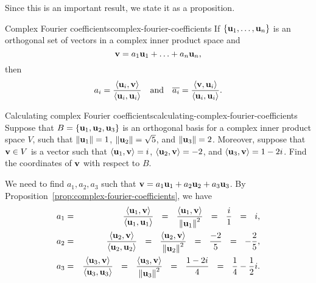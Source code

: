Since this is an important result, we state it as a proposition.

\begin{proposition}{Complex Fourier coefficients}{complex-fourier-coefficients}
  If $\set{\vect{u}_1,\ldots,\vect{u}_n}$ is an orthogonal set of
  vectors in a complex inner product space and
  \begin{equation*}
    \vect{v} = a_1\vect{u}_1 + \ldots + a_n\vect{u}_n,
  \end{equation*}
  then
  \begin{equation*}
    a_i = \frac{\iprod{\vect{u}_i,\vect{v}}}{\iprod{\vect{u}_i,\vect{u}_i}}
    \quad\mbox{and}\quad
    \conjugate{a_i} = \frac{\iprod{\vect{v},\vect{u}_i}}{\iprod{\vect{u}_i,\vect{u}_i}}.
  \end{equation*}
\end{proposition}

\begin{example}{Calculating complex Fourier coefficients}{calculating-complex-fourier-coefficients}
  Suppose that $B=\set{\vect{u}_1,\vect{u}_2,\vect{u}_3}$ is an
  orthogonal basis for a complex inner product space $V$, such that
  $\norm{\vect{u}_1}=1$, $\norm{\vect{u}_2}=\sqrt{5}$, and
  $\norm{\vect{u}_3}=2$. Moreover, suppose that $\vect{v}\in V$ is a
  vector such that $\iprod{\vect{u}_1,\vect{v}} = i$,
  $\iprod{\vect{u}_2,\vect{v}} = -2$, and
  $\iprod{\vect{u}_3,\vect{v}} = 1-2i$. Find the coordinates of
  $\vect{v}$ with respect to $B$.
\end{example}

\begin{solution}
  We need to find $a_1, a_2, a_3$ such that
  $\vect{v} = a_1\vect{u}_1 + a_2\vect{u}_2 + a_3\vect{u}_3$.  By
  Proposition~\ref{prop:complex-fourier-coefficients}, we have
  \begin{eqnarray*}
    a_1
    &=& \frac{\iprod{\vect{u}_1,\vect{v}}}{\iprod{\vect{u}_1,\vect{u}_1}}
        ~~=~~ \frac{\iprod{\vect{u}_1,\vect{v}}}{\norm{\vect{u}_1}^2}
        ~~=~~ \frac{i}{1}
        ~~=~~ i, \\
    a_2
    &=& \frac{\iprod{\vect{u}_2,\vect{v}}}{\iprod{\vect{u}_2,\vect{u}_2}}
        ~~=~~ \frac{\iprod{\vect{u}_2,\vect{v}}}{\norm{\vect{u}_2}^2}
        ~~=~~ \frac{-2}{5}
        ~~=~~ -\frac{2}{5}, \\
    a_3
    &=& \frac{\iprod{\vect{u}_3,\vect{v}}}{\iprod{\vect{u}_3,\vect{u}_3}}
        ~~=~~ \frac{\iprod{\vect{u}_3,\vect{v}}}{\norm{\vect{u}_3}^2}
        ~~=~~ \frac{1-2i}{4}
        ~~=~~ \frac{1}{4} - \frac{1}{2}i.
  \end{eqnarray*}
\end{solution}

